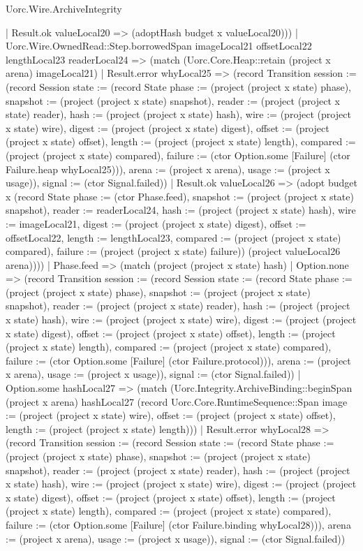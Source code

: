 \begin{lexlean}{Uorc.Wire.ArchiveIntegrity}
\begin{semanticmodule}
{            | Result.ok valueLocal20 => (adoptHash budget x valueLocal20)))
        | Uorc.Wire.OwnedRead::Step.borrowedSpan imageLocal21 offsetLocal22 lengthLocal23 readerLocal24 => (match (Uorc.Core.Heap::retain (project x arena) imageLocal21)
          | Result.error whyLocal25 => (record Transition {session := (record Session {state := (record State {phase := (project (project x state) phase), snapshot := (project (project x state) snapshot), reader := (project (project x state) reader), hash := (project (project x state) hash), wire := (project (project x state) wire), digest := (project (project x state) digest), offset := (project (project x state) offset), length := (project (project x state) length), compared := (project (project x state) compared), failure := (ctor Option.some [Failure] (ctor Failure.heap whyLocal25))}), arena := (project x arena), usage := (project x usage)}), signal := (ctor Signal.failed)})
          | Result.ok valueLocal26 => (adopt budget x (record State {phase := (ctor Phase.feed), snapshot := (project (project x state) snapshot), reader := readerLocal24, hash := (project (project x state) hash), wire := imageLocal21, digest := (project (project x state) digest), offset := offsetLocal22, length := lengthLocal23, compared := (project (project x state) compared), failure := (project (project x state) failure)}) (project valueLocal26 arena))))
      | Phase.feed => (match (project (project x state) hash)
        | Option.none => (record Transition {session := (record Session {state := (record State {phase := (project (project x state) phase), snapshot := (project (project x state) snapshot), reader := (project (project x state) reader), hash := (project (project x state) hash), wire := (project (project x state) wire), digest := (project (project x state) digest), offset := (project (project x state) offset), length := (project (project x state) length), compared := (project (project x state) compared), failure := (ctor Option.some [Failure] (ctor Failure.protocol))}), arena := (project x arena), usage := (project x usage)}), signal := (ctor Signal.failed)})
        | Option.some hashLocal27 => (match (Uorc.Integrity.ArchiveBinding::beginSpan (project x arena) hashLocal27 (record Uorc.Core.RuntimeSequence::Span {image := (project (project x state) wire), offset := (project (project x state) offset), length := (project (project x state) length)}))
          | Result.error whyLocal28 => (record Transition {session := (record Session {state := (record State {phase := (project (project x state) phase), snapshot := (project (project x state) snapshot), reader := (project (project x state) reader), hash := (project (project x state) hash), wire := (project (project x state) wire), digest := (project (project x state) digest), offset := (project (project x state) offset), length := (project (project x state) length), compared := (project (project x state) compared), failure := (ctor Option.some [Failure] (ctor Failure.binding whyLocal28))}), arena := (project x arena), usage := (project x usage)}), signal := (ctor Signal.failed)})
}
\end{semanticmodule}
\end{lexlean}
